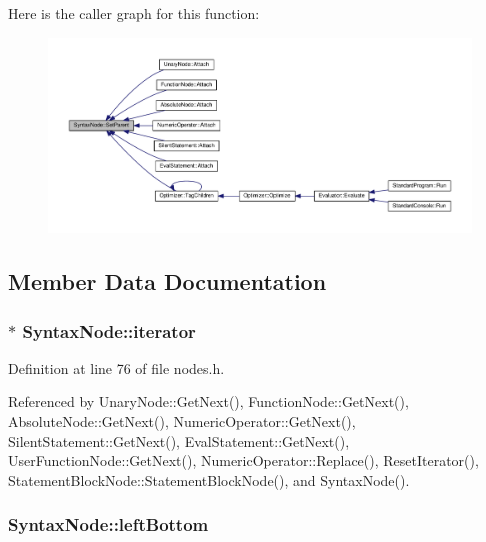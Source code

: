 Here is the caller graph for this function\+:\nopagebreak
\begin{figure}[H]
\begin{center}
\leavevmode
\includegraphics[width=350pt]{classSyntaxNode_a7902bb2c389a784c11c2b649a84824e9_icgraph}
\end{center}
\end{figure}




\subsection{Member Data Documentation}
\subsubsection[{\texorpdfstring{iterator}{iterator}}]{$\ast$ Syntax\+Node\+::iterator\hspace{0.3cm}{\ttfamily [protected]}}\hypertarget{classSyntaxNode_a9bd3349d05f33eaa271cca1805a86e1b}{}\label{classSyntaxNode_a9bd3349d05f33eaa271cca1805a86e1b}


Definition at line 76 of file nodes.\+h.



Referenced by Unary\+Node\+::\+Get\+Next(), Function\+Node\+::\+Get\+Next(), Absolute\+Node\+::\+Get\+Next(), Numeric\+Operator\+::\+Get\+Next(), Silent\+Statement\+::\+Get\+Next(), Eval\+Statement\+::\+Get\+Next(), User\+Function\+Node\+::\+Get\+Next(), Numeric\+Operator\+::\+Replace(), Reset\+Iterator(), Statement\+Block\+Node\+::\+Statement\+Block\+Node(), and Syntax\+Node().

\subsubsection[{\texorpdfstring{left\+Bottom}{leftBottom}}]{ Syntax\+Node\+::left\+Bottom\hspace{0.3cm}{\ttfamily [protected]}}\hypertarget{classSyntaxNode_ae0488f07ad7cc43143e44e89ec27bc40}{}\label{classSyntaxNode_ae0488f07ad7cc43143e44e89ec27bc40}


